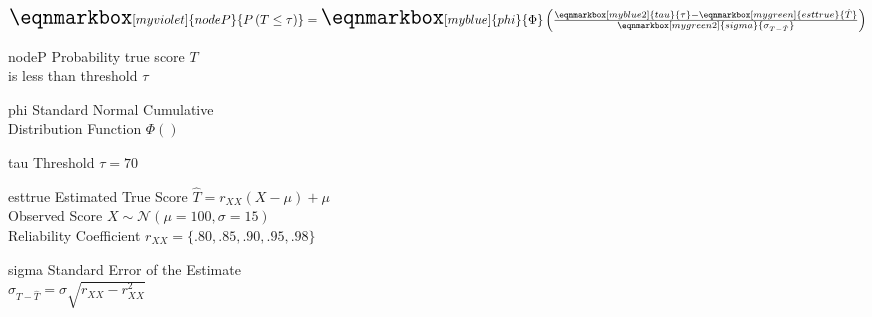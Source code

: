 \documentclass[border={10pt 48pt -45pt 62pt}]{standalone}
\begin{document}
	
\renewcommand{\eqnhighlightheight}{\mathstrut}
	
$\LARGE
\eqnmarkbox[myviolet]{nodeP}{P\left(T \le \tau \right)} = 
\eqnmarkbox[myblue]{phi}{\Phi}
\left(\frac{
	\eqnmarkbox[myblue2]{tau}{\tau}-
	\eqnmarkbox[mygreen]{esttrue}{\hat{T}}}{
	\eqnmarkbox[mygreen2]{sigma}{\sigma_{T - \hat{T}}}}
\right)$


	{nodeP}
	{Probability true score $T$\\ is less than threshold $\tau$ }
	
	{phi}
	{Standard Normal Cumulative\\ Distribution Function $\Phi()$}
	
	{tau}
	{Threshold $\tau=70$}
	
    {esttrue}
    {Estimated True Score $\hat{T}=r_{XX}(X-\mu)+\mu$\\ 
    Observed Score $X\sim \mathcal{N}\left(\mu = 100, \sigma=15\right)$\\ 
    Reliability Coefficient $r_{XX}=\{.80,.85,.90,.95,.98\}$}
	
    {sigma}
    {Standard Error of the Estimate\\ 
    $\sigma_{T-\hat{T}}=\sigma\sqrt{r_{XX}-r_{XX}^2}$}
	
\end{document}
